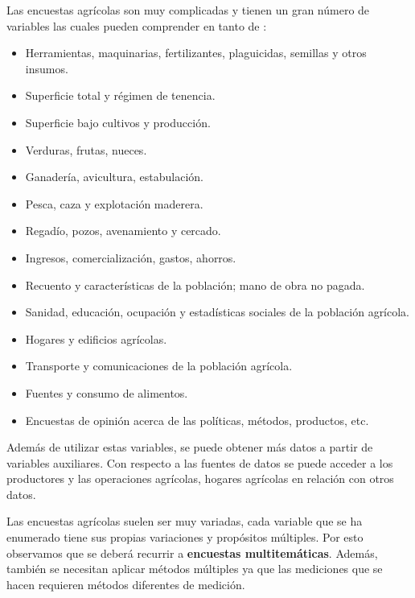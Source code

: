 \documentclass{report}
\begin{document}
Las encuestas agrícolas son muy complicadas y tienen un gran número de variables las cuales pueden comprender en tanto de \cite{organizacion-de-las-naciones-unidas-para-la-agricultura-y-la-alimentacion-1990}:

\begin{itemize}
    \item Herramientas, maquinarias, fertilizantes, plaguicidas, semillas y otros insumos.
    \item Superficie total y régimen de tenencia.
    \item Superficie bajo cultivos y producción.
    \item Verduras, frutas, nueces.
    \item Ganadería, avicultura, estabulación.
    
    \item Pesca, caza y explotación maderera.
    \item Regadío, pozos, avenamiento y cercado.
    \item Ingresos, comercialización, gastos, ahorros.
    \item Recuento y características de la población; mano de obra no pagada.
    \item Sanidad, educación, ocupación y estadísticas sociales de la población agrícola.
    \item Hogares y edificios agrícolas.
    \item Transporte y comunicaciones de la población agrícola.
    \item Fuentes y consumo de alimentos.
    \item Encuestas de opinión acerca de las políticas, métodos, productos, etc.
\end{itemize}

\bigbreak
    
Además de utilizar estas variables, se puede obtener más datos a partir de variables auxiliares. Con respecto a las fuentes de datos se puede acceder a los productores y las operaciones agrícolas, hogares agrícolas en relación con otros datos.

\bigbreak

Las encuestas agrícolas suelen ser muy variadas, cada variable que se ha enumerado tiene sus propias variaciones y propósitos múltiples. Por esto observamos que se deberá recurrir a \textbf{encuestas multitemáticas}. Además, también se necesitan aplicar métodos múltiples ya que las mediciones que se hacen requieren métodos diferentes de medición.
\end{document}
